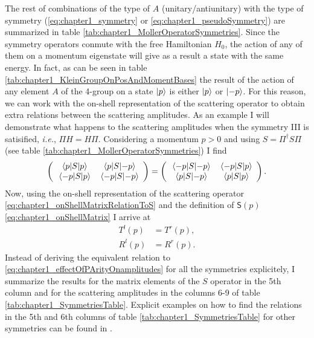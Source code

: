 %
The rest of combinations of the type of $A$ (unitary/antiunitary) with the type of symmetry (\eqref{eq:chapter1_symmetry} or \eqref{eq:chapter1_pseudoSymmetry}) are summarized in table \ref{tab:chapter1_MollerOperatorSymmetries}. Since the symmetry operators conmute with the free Hamiltonian $H_0$, the action of any of them on a momentum eigenstate will give as a result a state with the same energy. In fact, as can be seen in table \ref{tab:chapter1_KleinGroupOnPosAndMomentBases} the result of the action of any element $A$ of the 4-group on a state $\ket{p}$ is either $\ket{p}$ or $\ket{-p}$. For this reason, we can work with the on-shell representation of the scattering operator to obtain extra relations between the scattering amplitudes. As an example I will demonstrate what happens to the scattering amplitudes when the symmetry III is satisified, \textit{i.e.}, $\Pi H = H \Pi$. Considering a momentum $p>0$ and using $S = \Pi^{\dagger}S \Pi$ (see table \ref{tab:chapter1_MollerOperatorSymmetries}) I find
%
\begin{equation}
  \left(
  \begin{array}{cc}
    \mel{p}{S}{p} & \mel{p}{S}{-p}\\
    \mel{-p}{S}{p} & \mel{-p}{S}{-p}
  \end{array}
  \right)
  =
  \left(
  \begin{array}{cc}
    \mel{-p}{S}{-p} & \mel{-p}{S}{p}\\
    \mel{p}{S}{-p} & \mel{p}{S}{p}
  \end{array}
  \right).
\end{equation}
%
Now, using the on-shell representation of the scattering operator \eqref{eq:chapter1_onShellMatrixRelationToS} and the definition of $\mathsf{S}(p)$ \eqref{eq:chapter1_onShellMatrix} I arrive at
%
\begin{align}
  T^l(p) &= T^r(p),\nonumber\\
  R^l(p) &= R^r(p).
  \label{eq:chapter1_effectOfPArityOnamplitudes}
\end{align}
%
Instead of deriving the equivalent relation to \eqref{eq:chapter1_effectOfPArityOnamplitudes} for all the symmetries explicitely, I summarize the results for the matrix elements of the $S$ operator in the 5th column and for the scattering amplitudes in the columns 6-9 of table \ref{tab:chapter1_SymmetriesTable}. Explicit examples on how to find the relations in the 5th and 6th columns of table \ref{tab:chapter1_SymmetriesTable} for other symmetries can be found in \cite{Muga2004}.

